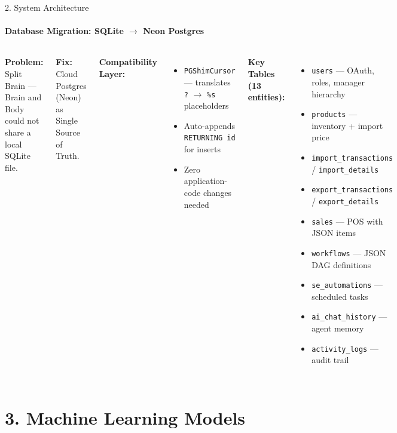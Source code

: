 \documentclass[10pt]{beamer}
\begin{document}
\begin{frame}{2. System Architecture}
    \framesubtitle{Database Migration: SQLite $\rightarrow$ Neon Postgres}
    \begin{columns}
        \textbf{Problem:} Split Brain --- Brain and Body could not share a local SQLite file.
        \vspace{0.3cm}

        \textbf{Fix:} Cloud Postgres (Neon) as Single Source of Truth.
        \vspace{0.3cm}

        \textbf{Compatibility Layer:}
        \begin{itemize}
            \item \texttt{PGShimCursor} --- translates \texttt{?} $\rightarrow$ \texttt{\%s} placeholders
            \item Auto-appends \texttt{RETURNING id} for inserts
            \item Zero application-code changes needed
        \end{itemize}

        \textbf{Key Tables (13 entities):}
        \begin{itemize}
            \item \texttt{users} --- OAuth, roles, manager hierarchy
            \item \texttt{products} --- inventory + import price
            \item \texttt{import\_transactions} / \texttt{import\_details}
            \item \texttt{export\_transactions} / \texttt{export\_details}
            \item \texttt{sales} --- POS with JSON items
            \item \texttt{workflows} --- JSON DAG definitions
            \item \texttt{se\_automations} --- scheduled tasks
            \item \texttt{ai\_chat\_history} --- agent memory
            \item \texttt{activity\_logs} --- audit trail
        \end{itemize}
    \end{columns}
\end{frame}

\section{3. Machine Learning Models}
\end{document}
